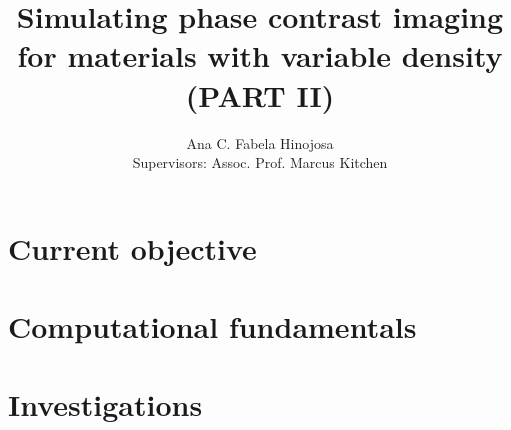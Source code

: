 \documentclass[9pt, a4paper]{article}
\title{Simulating phase contrast imaging for materials with variable density (PART II)}
\author{Ana C. Fabela Hinojosa \\
\small{Supervisors: Assoc. Prof. Marcus Kitchen}}
\begin{document}
\maketitle
\section{Current objective}

\section{Computational fundamentals}


\section{Investigations}
\end{document}
